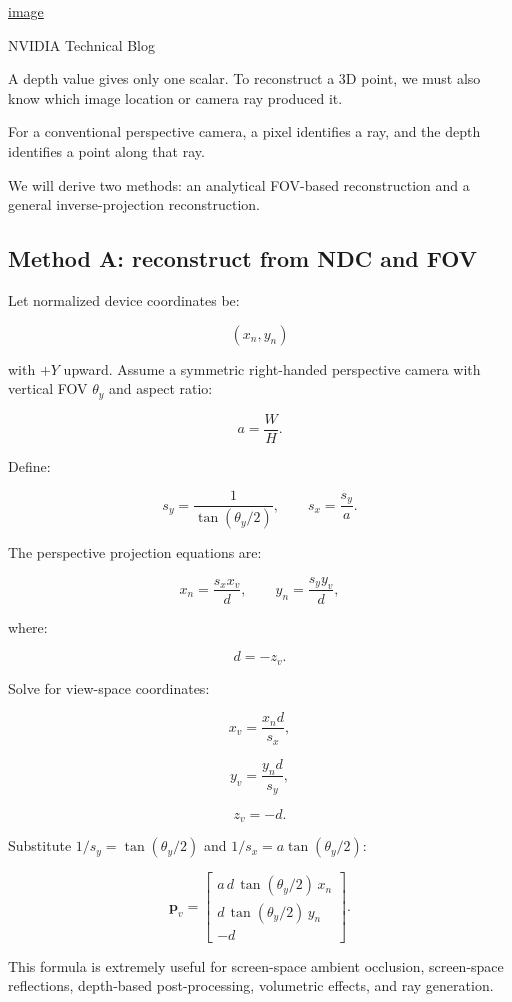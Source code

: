 \href{https://www.google.com/s2/favicons?domain=https://developer.nvidia.com&sz=32}{image}

NVIDIA Technical Blog

A depth value gives only one scalar. To reconstruct a 3D point, we must also know which image location or camera ray produced it.

For a conventional perspective camera, a pixel identifies a ray, and the depth identifies a point along that ray.

We will derive two methods: an analytical FOV-based reconstruction and a general inverse-projection reconstruction.

\subsection{Method A: reconstruct from NDC and FOV}\label{02-foundations-ii-ch035-method-a-reconstruct-from-ndc-and-fov}

Let normalized device coordinates be:

\[ (x_n,y_n) \]

with \(+Y\) upward. Assume a symmetric right-handed perspective camera with vertical FOV \(\theta_y\) and aspect ratio:

\[ a=\frac WH. \]

Define:

\[ s_y=\frac1{\tan(\theta_y/2)}, \qquad s_x=\frac{s_y}{a}. \]

The perspective projection equations are:

\[ x_n=\frac{s_xx_v}{d}, \qquad y_n=\frac{s_yy_v}{d}, \]

where:

\[ d=-z_v. \]

Solve for view-space coordinates:

\[ x_v=\frac{x_nd}{s_x}, \]

\[ y_v=\frac{y_nd}{s_y}, \]

\[ z_v=-d. \]

Substitute \(1/s_y=\tan(\theta_y/2)\) and \(1/s_x=a\tan(\theta_y/2)\):

\[ \boxed{ \mathbf p_v= \begin{bmatrix} a\,d\,\tan(\theta_y/2)\,x_n\\ d\,\tan(\theta_y/2)\,y_n\\ -d \end{bmatrix}. } \]

This formula is extremely useful for screen-space ambient occlusion, screen-space reflections, depth-based post-processing, volumetric effects, and ray generation.

